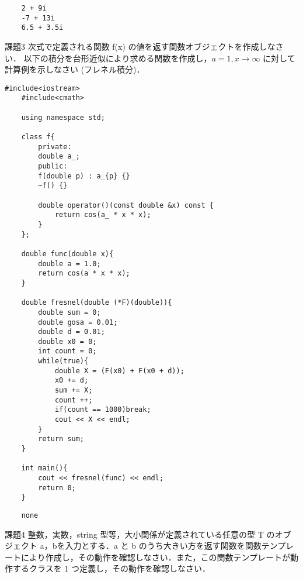 \documentclass[fleqn, a4paper. 12pt]{ltjsarticle} %
\begin{document}
\begin{screen}
\begin{verbatim}
    2 + 9i
    -7 + 13i
    6.5 + 3.5i
\end{verbatim}
\end{screen}

\newpage

\begin{itembox}[l]{課題3}
    次式で定義される関数 f(x) の値を返す関数オブジェクトを作成しなさい．
    以下の積分を台形近似により求める関数を作成し，$a = 1,x \rightarrow \infty$ に対して計算例を示しなさい (フレネル積分)．

\end{itembox}


\begin{lstlisting}[caption=kadai3, label=program3]
    #include<iostream>
    #include<cmath>
    
    using namespace std;
    
    class f{
        private:
        double a_;
        public:
        f(double p) : a_{p} {}
        ~f() {}
    
        double operator()(const double &x) const {
            return cos(a_ * x * x);
        }
    };
    
    double func(double x){
        double a = 1.0;
        return cos(a * x * x);
    }
    
    double fresnel(double (*F)(double)){
        double sum = 0;
        double gosa = 0.01;
        double d = 0.01;
        double x0 = 0;
        int count = 0;
        while(true){
            double X = (F(x0) + F(x0 + d));
            x0 += d;
            sum += X;
            count ++;
            if(count == 1000)break;
            cout << X << endl;
        }
        return sum;
    }
    
    int main(){
        cout << fresnel(func) << endl;
        return 0;
    }
\end{lstlisting}

\begin{screen}
\begin{verbatim}
    none
\end{verbatim}
\end{screen}

\newpage

\begin{itembox}[l]{課題4}
    整数，実数，string 型等，大小関係が定義されている任意の型 T のオブジェクト a，bを入力とする．a と b のうち大きい方を返す関数を関数テンプレートにより作成し，その動作を確認しなさい．また，この関数テンプレートが動作するクラスを 1 つ定義し，その動作を確認しなさい．
\end{itembox}
\end{document}
